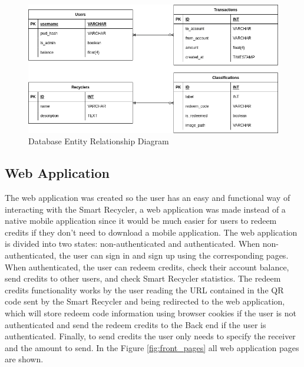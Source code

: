 \documentclass[a4paper,11pt]{article}
\begin{document}
\begin{figure}[H]
  \centering
  \includegraphics[width=12.5cm]{Figures/ERDiagram.png}
  \caption{\small{Database Entity Relationship Diagram}}
  \label{fig:er_diagram}
\end{figure}

\subsection{Web Application}
\label{subsec:webapp}
The web application was created so the user has an easy and functional way of interacting with the Smart Recycler, a web application was made instead of a native mobile application since it would be much easier for users to redeem credits if they don’t need to download a mobile application.
The web application is divided into two states: non-authenticated and authenticated. When non-authenticated, the user can sign in and sign up using the corresponding pages. When authenticated, the user can redeem credits, check their account balance, send credits to other users, and check Smart Recycler statistics. The redeem credits functionality works by the user reading the URL contained in the QR code sent by the Smart Recycler and being redirected to the web application, which will store redeem code information using browser cookies if the user is not authenticated and send the redeem credits to the Back end if the user is authenticated. Finally, to send credits the user only needs to specify the receiver and the amount to send.
In the Figure \ref{fig:front_pages} all web application pages are shown.
\end{document}
